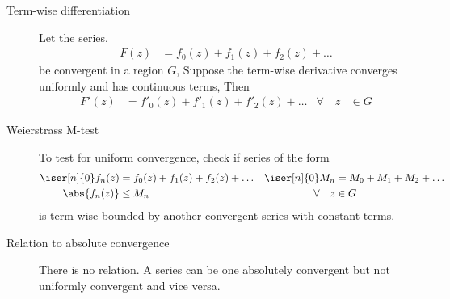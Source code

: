 \begin{description}
    \item[Term-wise differentiation] Let the series,
        \begin{align}
            F(z) & = f_0(z) + f_1(z) + f_2(z) + \dots
        \end{align}
        be convergent in a region $ G $, Suppose the term-wise derivative converges
        uniformly and has continuous terms, Then
        \begin{align}
            F'(z)           & = f'_0(z) + f'_1(z) + f'_2(z) + \dots &
            \forall \quad z & \in G
        \end{align}

    \item[Weierstrass M-test] To test for uniform convergence, check if series of the
        form
        \begin{align}
            \iser[n]{0} f_n(z) & = f_0(z) + f_1(z) + f_2(z) + \dots &
            \iser[n]{0} M_n    & = M_0 + M_1 + M_2 + \dots            \\
            \abs{f_n(z)}       & \leq M_n                           &
            \forall \quad z    & \in G
        \end{align}
        is term-wise bounded by another convergent series with constant terms.

    \item[Relation to absolute convergence] There is no relation. A series can
        be one absolutely convergent but not uniformly convergent and vice versa.

\end{description}